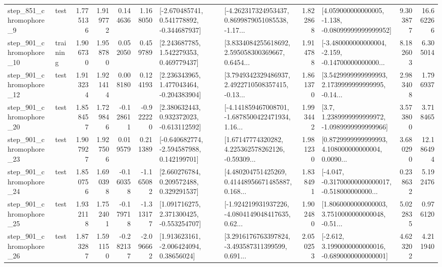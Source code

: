 \begin{tabular}{llrrrrllrlrr}
   step\_851\_chromophore\_9 &      test &      1.775136 &    1.919772 &      0.144636 &  1.168050 &   [-2.670485741, 0.541778892, -0.344687937] &  [-4.262317324953437, 0.8699879051085538, -1.17... &       1.822868 &  [4.059000000000005, -1.138, -0.08099999999999952] &            9.303877 &         16.662266 \\
  step\_901\_chromophore\_10 &  training &      1.906730 &    1.958780 &      0.052050 &  0.459789 &     [2.243687785, 1.542279353, 0.469779437] &  [3.8334084255618692, 2.595058300369667, 0.6454... &       1.914788 &  [-3.480000000000004, -2.159, -0.14700000000000... &            8.182603 &          6.305014 \\
  step\_901\_chromophore\_12 &      test &      1.913234 &    1.921414 &      0.008180 &  0.124193 &    [2.236343965, 1.477043464, -0.204383904] &  [3.7949342329486937, 2.4922710508357415, -0.13... &       1.861370 &  [3.5429999999999993, 2.1739999999999995, -0.14... &            2.983408 &          1.796937 \\
  step\_901\_chromophore\_20 &      test &      1.858457 &    1.729846 &     -0.128611 & -0.922220 &    [2.380632443, 0.932372023, -0.613112592] &  [-4.141859467008701, -1.6878500422471934, 1.16... &       1.993442 &     [3.7, 1.2389999999999972, -1.0989999999999966] &            3.573800 &          3.718465 \\
  step\_901\_chromophore\_23 &      test &      1.907927 &    1.927506 &      0.019579 &  0.211389 &   [-0.640682774, -2.594587988, 0.142199701] &  [1.67147774320282, 4.225362578262126, -0.59309... &       1.981230 &  [0.8729999999999993, 4.108000000000004, 0.0090... &            3.680290 &         12.186494 \\
  step\_901\_chromophore\_24 &      test &      1.850756 &    1.690398 &     -0.160358 & -1.165082 &     [2.660276784, 0.209572488, 0.329291537] &  [4.480204751425269, 0.41448956671485887, 0.168... &       1.838491 &  [-4.047, -0.31700000000000017, -0.518000000000... &            0.238632 &          5.192476 \\
  step\_901\_chromophore\_25 &      test &      1.932118 &    1.752401 &     -0.179718 & -1.313177 &    [1.091716275, 2.371300425, -0.553254707] &  [-1.924219931937226, -4.0804149048417635, 0.62... &       1.902480 &  [1.8060000000000003, 3.7510000000000048, -0.51... &            5.022835 &          0.976120 \\
  step\_901\_chromophore\_26 &      test &      1.873287 &    1.591150 &     -0.282137 & -2.096662 &     [1.913623161, -2.006424094, 0.38656024] &  [3.2916176763397824, -3.493587311399599, 0.691... &       2.050253 &  [-2.612, 3.1990000000000016, -0.6890000000000001] &            4.623202 &          4.211940 \\

\end{tabular}
